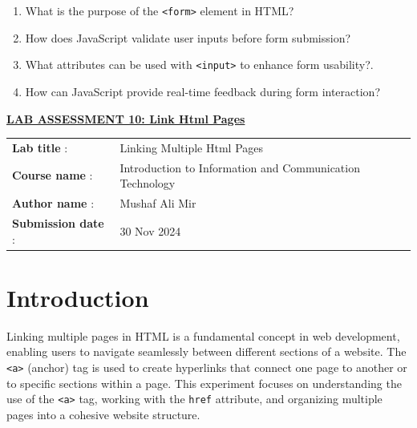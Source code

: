 \documentclass[a4paper,9pt]{article}
\begin{document}
\begin{enumerate}
	\item What is the purpose of the \texttt{\textless form\textgreater} element in HTML?
	
	\item How does JavaScript validate user inputs before form submission?
	\item What attributes can be used with \texttt{\textless input\textgreater} to enhance form usability?.
	\item How can JavaScript provide real-time feedback during form interaction?
	
\end{enumerate}

\newpage



\begin{center}
	{\Huge \bfseries \underline{ LAB ASSESSMENT 10: Link Html Pages } \par}
\end{center}
\noindent\begin{tabular}{@{}ll}
	\textbf{Lab title} :&Linking Multiple Html Pages \\
	\textbf{Course name} :&  Introduction to Information and Communication Technology\\
	\textbf{Author name} : & Mushaf Ali Mir\\
	\textbf{Submission date} :& 30 Nov 2024 \\
\end{tabular}

\section*{Introduction}
\setcounter{section}{10}
\setcounter{figure}{0}  %
\setcounter{subsection}{0}

Linking multiple pages in HTML is a fundamental concept in web development, enabling users to navigate seamlessly between different sections of a website. The \texttt{\textless a\textgreater} (anchor) tag is used to create hyperlinks that connect one page to another or to specific sections within a page. This experiment focuses on understanding the use of the \texttt{\textless a\textgreater} tag, working with the \texttt{href} attribute, and organizing multiple pages into a cohesive website structure.
\end{document}
